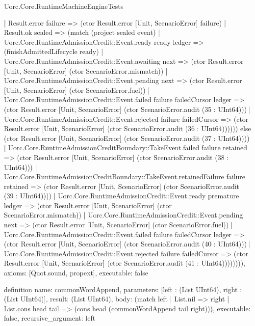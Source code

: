 \begin{lexlean}{Uorc.Core.RuntimeMachineEngineTests}
\begin{semanticmodule}
{                  | Result.error failure => (ctor Result.error [Unit, ScenarioError] failure)
                  | Result.ok sealed => (match (project sealed event)
                    | Uorc.Core.RuntimeAdmissionCredit::Event.ready ready ledger => (finishAdmittedLifecycle ready)
                    | Uorc.Core.RuntimeAdmissionCredit::Event.awaiting next => (ctor Result.error [Unit, ScenarioError] (ctor ScenarioError.mismatch))
                    | Uorc.Core.RuntimeAdmissionCredit::Event.pending next => (ctor Result.error [Unit, ScenarioError] (ctor ScenarioError.fuel))
                    | Uorc.Core.RuntimeAdmissionCredit::Event.failed failure failedCursor ledger => (ctor Result.error [Unit, ScenarioError] (ctor ScenarioError.audit (35 : UInt64)))
                    | Uorc.Core.RuntimeAdmissionCredit::Event.rejected failure failedCursor => (ctor Result.error [Unit, ScenarioError] (ctor ScenarioError.audit (36 : UInt64)))))) else (ctor Result.error [Unit, ScenarioError] (ctor ScenarioError.audit (37 : UInt64))))
              | Uorc.Core.RuntimeAdmissionCreditBoundary::TakeEvent.failed failure retained => (ctor Result.error [Unit, ScenarioError] (ctor ScenarioError.audit (38 : UInt64)))
              | Uorc.Core.RuntimeAdmissionCreditBoundary::TakeEvent.retainedFailure failure retained => (ctor Result.error [Unit, ScenarioError] (ctor ScenarioError.audit (39 : UInt64))))
            | Uorc.Core.RuntimeAdmissionCredit::Event.ready premature ledger => (ctor Result.error [Unit, ScenarioError] (ctor ScenarioError.mismatch))
            | Uorc.Core.RuntimeAdmissionCredit::Event.pending next => (ctor Result.error [Unit, ScenarioError] (ctor ScenarioError.fuel))
            | Uorc.Core.RuntimeAdmissionCredit::Event.failed failure failedCursor ledger => (ctor Result.error [Unit, ScenarioError] (ctor ScenarioError.audit (40 : UInt64)))
            | Uorc.Core.RuntimeAdmissionCredit::Event.rejected failure failedCursor => (ctor Result.error [Unit, ScenarioError] (ctor ScenarioError.audit (41 : UInt64)))))))),
  axioms: [Quot.sound, propext],
  executable: false
}

definition{
  name: commonWordAppend,
  parameters: [left : (List UInt64), right : (List UInt64)],
  result: (List UInt64),
  body: (match left
    | List.nil => right
    | List.cons head tail => (cons head (commonWordAppend tail right))),
  executable: false,
  recursive_argument: left
}


\end{semanticmodule}
\end{lexlean}
